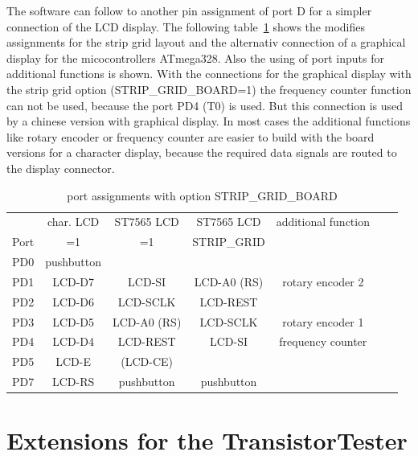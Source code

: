 The software can follow to another pin assignment of port D for a simpler connection of the
LCD display. 
The following table~\ref{tab:grid-change} shows the modifies assignments for the strip grid layout and
the alternativ connection of a graphical display for the micocontrollers ATmega328.
Also the using of port inputs for additional functions is shown.
With the connections for the graphical display with the strip grid option (STRIP\_GRID\_BOARD=1)
the frequency counter function can not be used, because the port PD4 (T0) is used.
But this connection is used by a chinese version with graphical display. 
In most cases the additional functions like rotary encoder or frequency counter are easier to
build with the board versions for a character display, because the required data signals are
routed to the display connector.



\begin{table}[H]
  \begin{center}
    \begin{tabular}{| c || c | c | c | c | c | c |}
    \hline
           & char. LCD    & ST7565 LCD & ST7565 LCD    & additional function \\
      Port &   =1         &   =1       & STRIP\_GRID   & \\
    \hline
    \hline
    PD0    &  pushbutton  &              &             & \\
    \hline
    PD1    &  LCD-D7      &  LCD-SI      & LCD-A0 (RS) &  rotary encoder 2  \\
    \hline
    PD2    &  LCD-D6      &  LCD-SCLK    & LCD-REST    & \\
    \hline
    PD3    &  LCD-D5      &  LCD-A0 (RS) & LCD-SCLK    & rotary encoder 1 \\
    \hline
    PD4    &  LCD-D4      &  LCD-REST    & LCD-SI      & frequency counter \\
    \hline
    PD5    &  LCD-E       &  (LCD-CE)    &             & \\
    \hline
    PD7    &  LCD-RS      &  pushbutton  & pushbutton  & \\
    \hline
    \end{tabular}
  \end{center}
  \caption{port assignments with option STRIP\_GRID\_BOARD}
  \label{tab:grid-change}
\end{table}

\section {Extensions for the TransistorTester}

